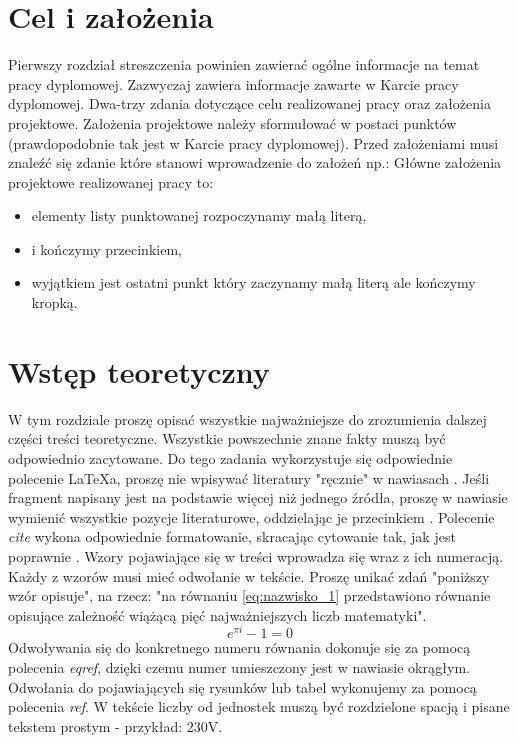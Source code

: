 \section{Cel i założenia}
Pierwszy rozdział streszczenia powinien zawierać ogólne informacje na temat pracy dyplomowej. Zazwyczaj zawiera informacje zawarte w Karcie pracy dyplomowej. Dwa-trzy zdania dotyczące celu realizowanej pracy oraz założenia projektowe. Założenia projektowe należy sformułować w postaci punktów (prawdopodobnie tak jest w Karcie pracy dyplomowej). Przed założeniami musi znaleźć się zdanie które stanowi wprowadzenie do założeń np.: Główne założenia projektowe realizowanej pracy to:
\begin{itemize}
	\item elementy listy punktowanej rozpoczynamy małą literą,
	\item i kończymy przecinkiem,
	\item wyjątkiem jest ostatni punkt który zaczynamy małą literą ale kończymy kropką.
\end{itemize}

\section{Wstęp teoretyczny}
W tym rozdziale proszę opisać wszystkie najważniejsze do zrozumienia dalszej części treści teoretyczne. Wszystkie powszechnie znane fakty muszą być odpowiednio zacytowane. Do tego zadania wykorzystuje się odpowiednie polecenie LaTeXa, proszę nie wpisywać literatury "ręcznie" w nawiasach \cite{poz1}. Jeśli fragment napisany jest na podstawie więcej niż jednego źródła, proszę w nawiasie wymienić wszystkie pozycje literaturowe, oddzielając je przecinkiem \cite{poz1, poz2, poz3, poz4}. Polecenie \textit{cite} wykona odpowiednie formatowanie, skracając cytowanie tak, jak jest poprawnie \cite{poz5, poz6}. Wzory pojawiające się w treści wprowadza się wraz z ich numeracją. Każdy z wzorów musi mieć odwołanie w tekście. Proszę unikać zdań "poniższy wzór opisuje", na rzecz: "na równaniu \eqref{eq:nazwisko_1} przedstawiono równanie opisujące zależność wiążącą pięć najważniejszych liczb matematyki".
\begin{equation}
	e^{\pi i }-1 = 0
	\label{eq:nazwisko_1}
\end{equation}
Odwoływania się do konkretnego numeru równania dokonuje się za pomocą polecenia \textit{eqref}, dzięki czemu numer umieszczony jest w nawiasie okrągłym. Odwołania do pojawiających się rysunków lub tabel wykonujemy za pomocą polecenia \textit{ref}. W tekście liczby od jednostek muszą być rozdzielone spacją i pisane tekstem prostym - przykład: $230 \textrm{V}$.
